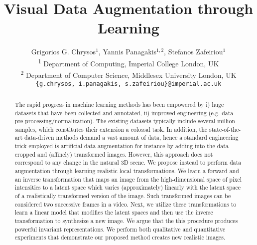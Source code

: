 \documentclass[10pt,twocolumn,letterpaper]{article}
\begin{document}
\title{Visual Data Augmentation through Learning}

\author{
Grigorios G. Chrysos$^{1}$, \quad Yannis Panagakis$^{1,2}$, \quad Stefanos Zafeiriou$^{1}$ \\ 
{\textsuperscript{1} Department of Computing, Imperial College London, UK}\\
{\textsuperscript{2} Department of Computer Science, Middlesex University London, UK}\\
{\texttt{\{g.chrysos, i.panagakis, s.zafeiriou\}@imperial.ac.uk}}
}

\maketitle

\begin{abstract}
  The rapid progress in machine learning methods has been empowered by i) huge datasets that have been collected and annotated, ii) improved engineering (e.g. data pre-processing/normalization). The existing datasets typically include several million samples, which constitutes their extension a colossal task. In addition, the state-of-the-art data-driven methods demand a vast amount of data, hence a standard engineering trick employed is artificial data augmentation
  for instance by adding into the data cropped and  (affinely) transformed images. However, this approach does not correspond to any change in the natural 3D scene.
  We propose instead to perform data augmentation through learning realistic local transformations. We learn a forward and an inverse transformation that maps an image from the high-dimensional space of pixel intensities to a latent space
  which varies (approximately) linearly with the latent space of a realistically transformed version of the image. Such transformed images can be considered two successive frames in a video. Next,
   we utilize these transformations to learn a linear model that modifies the latent spaces and then use the inverse transformation to synthesize a new image. We argue that the this procedure produces powerful invariant representations. We perform both qualitative and quantitative experiments that demonstrate our proposed method creates new realistic images.
\end{abstract}
\end{document}
